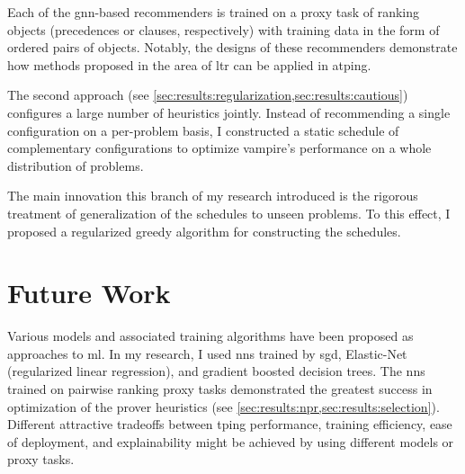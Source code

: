 Each of the \acrshort{gnn}-based recommenders is trained on a proxy task of ranking objects (precedences or clauses, respectively)
with training data in the form of ordered pairs of objects.
Notably, the designs of these recommenders demonstrate how methods proposed in the area of \acrlong{ltr}
can be applied in \gls{atping}.

The second approach (see \cref{sec:results:regularization,sec:results:cautious}) configures a large number of heuristics jointly.
Instead of recommending a single configuration on a per-problem basis,
I constructed a static schedule of complementary configurations to optimize \gls{vampire}'s performance on a whole distribution of problems.

The main innovation this branch of my research introduced is the rigorous treatment of generalization of the schedules to unseen problems.
To this effect, I proposed a regularized greedy algorithm for constructing the schedules.


\section{Future Work}



Various models and associated training algorithms have been proposed as approaches to \gls{ml}.
In my research, I used \glspl{nn} trained by \acrlong{sgd}, Elastic-Net (regularized linear regression), and gradient boosted decision trees.
The \glspl{nn} trained on pairwise ranking proxy tasks demonstrated the greatest success in optimization of the prover heuristics (see \cref{sec:results:npr,sec:results:selection}).
Different attractive tradeoffs between \gls{tping} performance, training efficiency, ease of deployment, and explainability might be achieved by using different models or proxy tasks.

